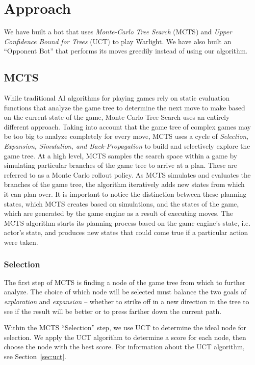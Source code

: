 \documentclass[a4paper,11pt]{article}
\begin{document}
\section{Approach}\label{sec:approach}
We have built a bot that uses \emph{Monte-Carlo Tree Search} (MCTS) and \emph{Upper 
Confidence Bound for Trees} (UCT) to play Warlight.  We have also built an ``Opponent Bot'' 
that performs its moves greedily instead of using our algorithm.

\subsection{MCTS}
While traditional AI algorithms for playing games rely on static evaluation functions that 
analyze the game tree to determine the next move to make based on the current state of the 
game, Monte-Carlo Tree Search uses an entirely different approach.  Taking into account that 
the game tree of complex games may be too big to analyze completely for every move, MCTS 
uses a cycle of \emph{Selection, Expansion, Simulation, and Back-Propagation} to build and selectively 
explore the game tree.  At a high level, MCTS samples the search space within a game by simulating
particular branches of the game tree to arrive at a plan.  These are referred to as a Monte Carlo 
rollout policy. As MCTS simulates and evaluates the branches of the game tree, the algorithm 
iteratively adds new states from which it can plan over.  It is important to notice the distinction
between these planning states, which MCTS creates based on simulations, and the states of the game, 
which are generated by the game engine as a result of executing moves.  The MCTS algorithm starts its
planning process based on the game engine's state, i.e. actor's state, and produces new states that
could come true if a particular action were taken.

\subsubsection{Selection}
The first step of MCTS is finding a node of the game tree from which to further 
analyze.  The choice of which node will be selected must balance the two goals of 
\emph{exploration} and \emph{expansion} -- whether to strike off in a new direction in the 
tree to see if the result will be better or to press farther down the current path.

Within the MCTS ``Selection'' step, we use UCT to determine the ideal node for 
selection.  We apply the UCT algorithm to determine a score for each node, then choose the 
node with the best score.  For information about the UCT algorithm, see Section~\ref{sec:uct}.
\end{document}
